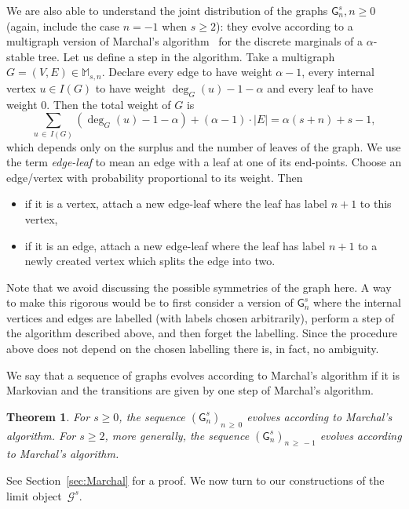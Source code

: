 \documentclass[10pt]{amsart}
\newtheorem{theo}{Theorem}[section]
\theoremstyle{definition}\newtheorem{defi}[theo]{Definition}\newtheorem{rema}[theo]{Remark}\newtheorem{exam}[theo]{Example}\newtheorem{exem}[theo]{Example}\newtheorem{nota}[theo]{Notation}
\newcommand{\cG}{\mathcal{G}}
\newcommand{\sG}{\mathsf{G}}
\newcommand{\M}{\mathbb{M}}
\begin{document}
We are also able to understand the joint distribution of the graphs $\sG_{n}^s,n\geq 0$ (again, include the case $n=-1$ when $s\geq 2$): they evolve according to a multigraph version of Marchal's algorithm~\cite{Marchal} for the discrete marginals of a $\alpha$-stable tree. Let us define a step in the algorithm. Take a multigraph $G=(V,E)\in \M_{s,n}$. Declare every edge to have weight $\alpha-1$, every internal vertex $u\in I(G)$ to have weight $\deg_G(u)-1-\alpha$ and every leaf to have weight 0. Then the total weight of $G$ is
\begin{equation}\label{identity:degrees}
\sum_{u\,\in\,I(G)}\left(\deg_G(u)-1-\alpha\right)+ (\alpha-1) \cdot |E|=\alpha(s+n)+s-1,
\end{equation}
which depends only on the surplus and the number of leaves of the graph. We use the term \emph{edge-leaf} to mean an edge with a leaf at one of its end-points. Choose an edge/vertex with probability proportional to its weight. Then
\begin{itemize}
\item if it is a vertex, attach a new edge-leaf where the leaf has label $n+1$ to this vertex,
\item if it is an edge, attach a new edge-leaf where the leaf has label $n+1$ to a newly created vertex which splits the edge into two.
\end{itemize}
Note that we avoid discussing the possible symmetries of the graph here. A way to make this rigorous would be to first consider a version of $\sG_{n}^s$ where the internal vertices and edges are labelled (with labels chosen arbitrarily), perform a step of the algorithm described above, and then forget the labelling. Since the procedure above does not depend on the chosen labelling there is, in fact, no ambiguity.

We say that a sequence of graphs evolves according to Marchal's algorithm if it is Markovian and the transitions are given by one step of Marchal's algorithm.

\begin{theo}\label{thm:MarchalAlg}
For $s \ge 0$, the sequence $(\sG_n^s)_{n\,\ge\,0}$ evolves according to Marchal's algorithm. For $s \geq 2$, more generally, the sequence $(\sG_n^s)_{n\,\ge\, -1}$ evolves according to Marchal's algorithm.
\end{theo}

See Section~\ref{sec:Marchal} for a proof. We now turn to our constructions of the limit object~$\cG^s$.
\end{document}
